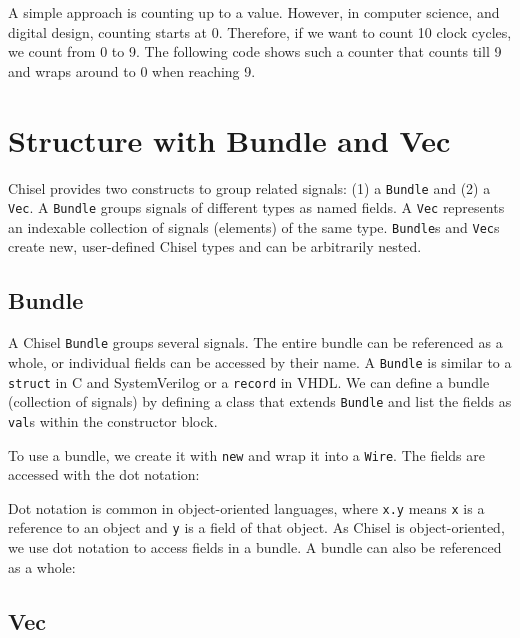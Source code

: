 \documentclass[%
    10pt,
    headinclude, footexclude,
    openright, %
    notitlepage,
    cleardoubleempty,
    headsepline,
    pointlessnumbers,
    bibtotoc, idxtotoc,
    ]{scrbook}
\newcommand{\code}[1]{{\lstinline[basicstyle=\small\ttfamily]{#1}}}
\begin{document}
A simple approach is counting up to a value. However, in computer science,
and digital design, counting starts at 0. Therefore, if we want to count
10 clock cycles, we count from 0 to 9. The following code shows such a counter that counts
till 9 and wraps around to 0 when reaching 9.


\section{Structure with Bundle and Vec}


Chisel provides two constructs to group related signals: (1) a \code{Bundle} and (2) a \code{Vec}.
A \code{Bundle} groups signals of different types as named fields.
A \code{Vec} represents an indexable collection of signals (elements) of the same type.
\code{Bundle}s and \code{Vec}s create new, user-defined Chisel types and can be arbitrarily nested.

\subsection{Bundle}

A Chisel \code{Bundle} groups several signals. The entire bundle can be referenced
as a whole, or individual fields can be accessed by their name.
A \code{Bundle} is similar to a \code{struct} in C and SystemVerilog or a \code{record} in VHDL.
We can define a bundle (collection of signals) by defining a class that
extends \code{Bundle} and list the fields as \code{val}s within the constructor block.


\noindent To use a bundle, we create it with \code{new} and wrap it into a \code{Wire}.
The fields are accessed with the dot notation:


Dot notation is common in object-oriented languages, where \code{x.y} means
\code{x} is a reference to an object and \code{y} is a field of that object.
As Chisel is object-oriented, we use dot notation to access fields in a bundle.
A bundle can also be referenced as a whole:


\subsection{Vec}
\end{document}
